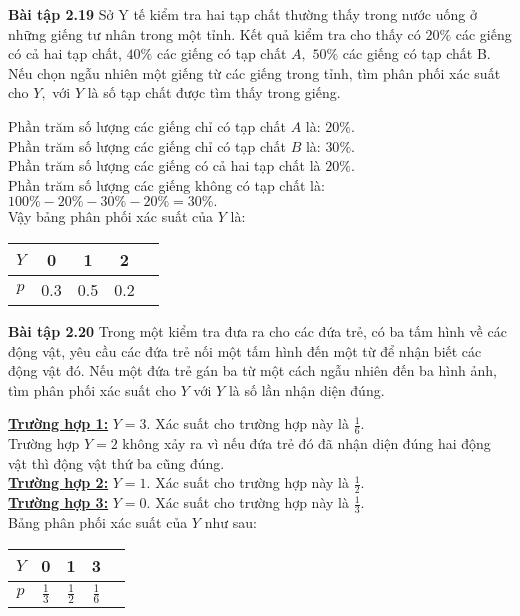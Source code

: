 \documentclass[12pt,a4paper]{article}
\begin{document}
\begin{mybox}
    \textbf{Bài tập 2.19} Sở Y tế kiểm tra hai tạp chất thường thấy trong nước uống ở những giếng tư nhân trong một tỉnh.
    Kết quả kiểm tra cho thấy có $20\%$ các giếng có cả hai tạp chất, $40\%$ các giếng có tạp chất $A,$ $50\%$ các giếng có tạp chất B.
    Nếu chọn ngẫu nhiên một giếng từ các giếng trong tỉnh, tìm phân phối xác suất cho $Y,$ với $Y$ là số tạp chất được tìm thấy trong giếng.
\end{mybox}
Phần trăm số lượng các giếng chỉ có tạp chất $A$ là: $20\%.$\\
Phần trăm số lượng các giếng chỉ có tạp chất $B$ là: $30\%.$\\
Phần trăm số lượng các giếng có cả hai tạp chất là $20\%.$\\
Phần trăm số lượng các giếng không có tạp chất là: $100\% - 20\% - 30\% - 20\% = 30\%.$\\
Vậy bảng phân phối xác suất của $Y$ là:
\begin{table}[H]
    \begin{center}
        \begin{tabular}{|c|c|c|c|c|}
            \hline 
            $Y$ & 0 & 1 & 2  \\ 
            \hline 
            $p$ & 0.3 & 0.5 & 0.2  \\ 
            \hline 
            \end{tabular} 
    \end{center}
\end{table}

\begin{mybox}
    \textbf{Bài tập 2.20} Trong một kiểm tra đưa ra cho các đứa trẻ, có ba tấm hình về các động vật, yêu cầu các đứa trẻ nối một tấm hình đến
    một từ để nhận biết các động vật đó. Nếu một đứa trẻ gán ba từ một cách ngẫu nhiên đến ba hình ảnh, tìm phân phối xác suất cho $Y$ với 
    $Y$ là số lần nhận diện đúng.
\end{mybox}
\textbf{\underline{Trường hợp 1:}} $Y = 3.$ Xác suất cho trường hợp này là $\frac{1}{6}.$\\
Trường hợp $Y = 2$ không xảy ra vì nếu đứa trẻ đó đã nhận diện đúng hai động vật thì động vật thứ ba cũng đúng.\\
\textbf{\underline{Trường hợp 2:}} $Y = 1.$ Xác suất cho trường hợp này là $\frac{1}{2}.$\\
\textbf{\underline{Trường hợp 3:}} $Y = 0.$ Xác suất cho trường hợp này là $\frac{1}{3}.$\\
Bảng phân phối xác suất của $Y$ như sau:
\begin{table}[H]
    \begin{center}
        \begin{tabular}{|c|c|c|c|c|}
            \hline 
            $Y$ & 0 & 1 & 3  \\ 
            \hline 
            $p$ & $\frac{1}{3}$ & $\frac{1}{2}$ & $\frac{1}{6}$  \\ 
            \hline 
            \end{tabular} 
    \end{center}
\end{table}
\end{document}
